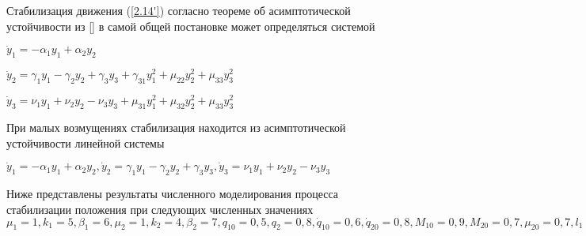 Стабилизация движения (\ref{2.14'}) согласно теореме об асимптотической устойчивости из [] в самой общей постановке может определяться системой

$\dot y_1 = - \alpha_1 y_1 + \alpha_2 y_2$

$\dot y_2 = \gamma_1 y_1 - \gamma_2 y_2 + \gamma_3 y_3 + \gamma_{31} y_1^2 + \mu_{22} y_2^2 + \mu_{33} y_3^2$

$\dot y_3 = \nu_1 y_1 + \nu_2 y_2 - \nu_3 y_3 + \mu_{31} y_1^2 + \mu_{32} y_2^2 + \mu_{33} y_3^2$

При малых возмущениях стабилизация находится из асимптотической устойчивости линейной системы

$\dot y_1 = - \alpha_1 y_1 + \alpha_2 y_2, \dot y_2 = \gamma_1 y_1 - \gamma_2 y_2 + \gamma_3 y_3, \dot y_3 = \nu_1 y_1 + \nu_2 y_2 - \nu_3 y_3$

Ниже представлены результаты численного моделирования процесса стабилизации положения при следующих численных значениях $\mu_1 = 1, k_1 = 5, \beta_1 = 6, \mu_2 = 1, k_2 = 4, \beta_2 = 7, q_{10} = 0,5, q_2 = 0,8, \dot q_{10} = 0,6, \dot q_{20} = 0,8, M_{10} = 0,9, M_{20} = 0,7, \mu_{20} = 0,7, l_1 = 1 м, l_{g_2} = 0,5 м, I_1 = I_2 = 3,33 кг м 3, m_2 = 10 кг$ 